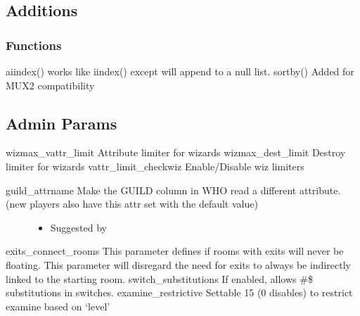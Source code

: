 \documentclass[letterpaper,10pt,english]{sphinxmanual}
\begin{document}
\subsection{Additions}
\label{\detokenize{changelog:id7}}

\subsubsection{Functions}
\label{\detokenize{changelog:id8}}
\sphinxAtStartPar
aiindex() \sphinxhyphen{} works like iindex() except will append to a null list.
sortby() \sphinxhyphen{} Added for MUX2 compatibility


\subsection{Admin Params}
\label{\detokenize{changelog:id9}}
\sphinxAtStartPar
wizmax\_vattr\_limit   \sphinxhyphen{} Attribute limiter for wizards
wizmax\_dest\_limit    \sphinxhyphen{} Destroy limiter for wizards
vattr\_limit\_checkwiz \sphinxhyphen{} Enable/Disable wiz limiters
\begin{description}
\item[{guild\_attrname       \sphinxhyphen{} Make the GUILD column in WHO read a different attribute. (new players also have this attr set with the default value)}] \leavevmode\begin{itemize}
\item {} 
\sphinxAtStartPar
Suggested by 

\end{itemize}

\end{description}

\sphinxAtStartPar
exits\_connect\_rooms  \sphinxhyphen{} This parameter defines if rooms with exits will never be floating.  This parameter will disregard the need for exits to always be indirectly linked to the starting room.
switch\_substitutions \sphinxhyphen{} If enabled, allows \#\$ substitutions in switches.
examine\_restrictive  \sphinxhyphen{} Settable 1\sphinxhyphen{}5 (0 disables) to restrict examine based on ‘level’
\end{document}
